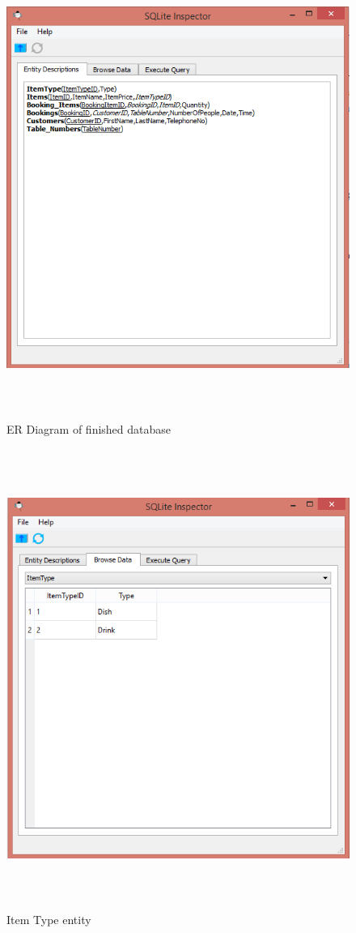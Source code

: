 \begin{figure}[H]
    \includegraphics[height = 15cm]{./Maintenance/images/entities}
    \caption{ER Diagram of finished database} \label{fig:entities}
\end{figure}

\begin{figure}[H]
    \includegraphics[height = 15cm]{./Maintenance/images/itemtype}
    \caption{Item Type entity} \label{fig:itemtype}
\end{figure}

